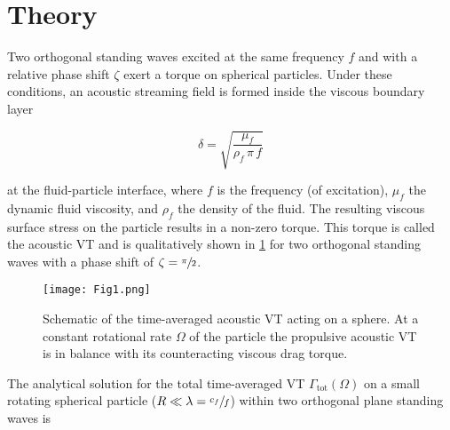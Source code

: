 \section{Theory \label{sec:theory}}

Two orthogonal standing waves excited at the same frequency $f$ and with a 
relative phase shift $\zeta$ exert a torque on spherical particles. Under these 
conditions, an acoustic streaming field is formed inside the viscous boundary 
layer

\begin{equation}
    \delta = \sqrt{\frac{\mu_{f}}{\rho_{f}\,\pi\,f}}
    \label{eq:delta}
\end{equation}

at the fluid-particle interface, where $f$ is the frequency (of excitation), 
$\mu_{f}$ the dynamic fluid viscosity, and $\rho_{f}$ the density of the fluid. 
The resulting viscous surface stress on the particle results in a non-zero 
torque. This torque is called the acoustic VT and is qualitatively shown in 
\cref{fig:Fig1} for two orthogonal standing waves with a phase shift of $\zeta = 
\sfrac{\pi}{2}$.

\begin{figure}
    \centering
    \texttt{[image: Fig1.png]}
    \caption{Schematic of the time-averaged acoustic VT acting on a sphere. At a 
    constant rotational rate $\Omega$ of the particle the propulsive acoustic VT 
is in balance with its counteracting viscous drag torque.\label{fig:Fig1}}
\end{figure}%

The analytical solution for the total time-averaged VT 
$\Gamma_{\text{tot}}(\Omega)$ on a small rotating spherical particle 
($R\ll\lambda=\sfrac{c_f}{f}$) within two orthogonal plane standing waves is 


